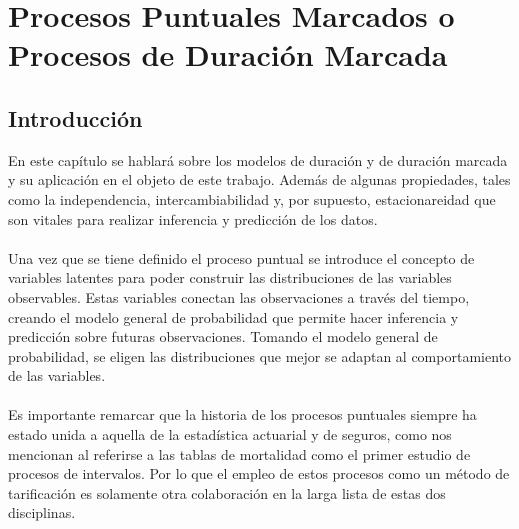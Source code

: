 \chapter{Procesos Puntuales Marcados o Procesos de Duraci\'on Marcada}
\section{Introducci\'on}
En este cap\'itulo se hablar\'a sobre los modelos de duraci\'on y de duraci\'on marcada y su aplicaci\'on en el objeto de este trabajo. Adem\'as de algunas propiedades, tales como la independencia, intercambiabilidad y, por supuesto, estacionareidad que son vitales para realizar inferencia y predicci\'on de los datos.\\
\\
Una vez que se tiene definido el proceso puntual se introduce el concepto de variables latentes para poder construir las distribuciones de las variables observables. Estas variables conectan las observaciones a trav\'es del tiempo, creando el modelo general de probabilidad que permite hacer inferencia y predicci\'on sobre futuras observaciones. Tomando el modelo general de probabilidad, se eligen las distribuciones que mejor se adaptan al comportamiento de las variables.\\
\\
Es importante remarcar que la historia de los procesos puntuales siempre ha estado unida a aquella de la estad\'istica actuarial y de seguros, como nos mencionan \cite{daley2003} al referirse a las tablas de mortalidad como el primer estudio de procesos de intervalos. Por lo que el empleo de estos procesos como un m\'etodo de tarificaci\'on es solamente otra colaboraci\'on en la larga lista de estas dos disciplinas.
\\
